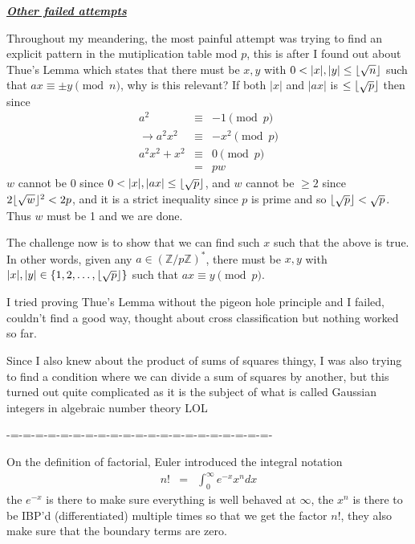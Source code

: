 \documentclass[aps,preprint,preprintnumbers,nofootinbib,showpacs,prd]{revtex4-1}
\newcommand{\nbea}{\begin{eqnarray*}}
\newcommand{\neea}{\end{eqnarray*}}
\DeclarePairedDelimiter{\floor}{\lfloor}{\rfloor}
\begin{document}
\smallskip
\underline{\textit{\textbf{Other failed attempts}}}
\smallskip

Throughout my meandering, the most painful attempt was trying to find an explicit pattern in the mutiplication table mod $p$, this is after I found out about Thue's Lemma which states that there must be $x,y$ with $0<|x|,|y|\le \floor{\sqrt{n}}$ such that $ax \equiv \pm y \pmod{n}$, why is this relevant? If both $|x|$ and $|ax|$ is $\le \floor{\sqrt{p}}$ then since
%
\nbea
a^2 & \equiv & -1 \pmod{p} \\
\to a^2x^2 & \equiv & -x^2 \pmod{p} \\
a^2x^2 + x^2 & \equiv & 0 \pmod{p} \\
& = & pw
\neea
%
$w$ cannot be 0 since $0 < |x|, |ax| \le \floor{\sqrt{p}}$, and $w$ cannot be $\ge 2$ since $2\floor{\sqrt{w}}^2 < 2p$, and it is a strict inequality since $p$ is prime and so $\floor{\sqrt{p}} < \sqrt{p}$. Thus $w$ must be 1 and we are done.

The challenge now is to show that we can find such $x$ such that the above is true. In other words, given any $a \in (\mathbb{Z}/p\mathbb{Z})^*$, there must be $x, y$ with $|x|,|y| \in \{1,2,\dots,\floor{\sqrt{p}}\}$ such that $ax \equiv y \pmod{p}$.

I tried proving Thue's Lemma without the pigeon hole principle and I failed, couldn't find a good way, thought about cross classification but nothing worked so far.

Since I also knew about the product of sums of squares thingy, I was also trying to find a condition where we can divide a sum of squares by another, but this turned out quite complicated as it is the subject of what is called Gaussian integers in algebraic number theory LOL

-=-=-=-=-=-=-=-=-=-=-=-=-=-=-=-=-=-=-=-=-=-

On the definition of factorial, Euler introduced the integral notation
%
\nbea
n! & = & \int_0^\infty e^{-x} x^n dx
\neea
%
the $e^{-x}$ is there to make sure everything is well behaved at $\infty$, the $x^n$ is there to be IBP'd (differentiated) multiple times so that we get the factor $n!$, they also make sure that the boundary terms are zero.
\end{document}
